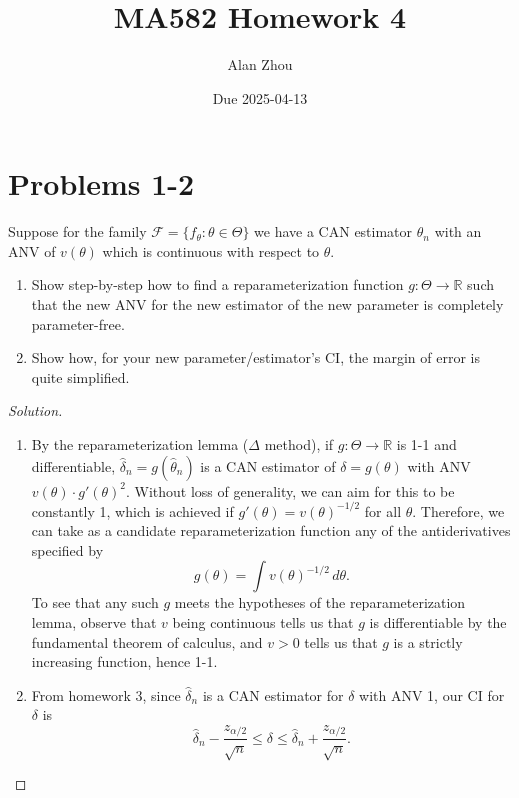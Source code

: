 \documentclass{article}
\title{MA582 Homework 4}
\author{Alan Zhou}
\date{Due 2025-04-13}
\begin{document}
\maketitle


\section{Problems 1-2}

Suppose for the family $\mathcal{F} = \{f_{\theta}:\theta\in\Theta\}$ we have a CAN estimator $\hat{\theta}_n$ with an ANV of $v(\theta)$ which is continuous with respect to $\theta$.

\begin{enumerate}
\item Show step-by-step how to find a reparameterization function $g:\Theta\to\mathbb{R}$ such that the new ANV for the new estimator of the new parameter is completely parameter-free.
\item Show how, for your new parameter/estimator's CI, the margin of error is quite simplified.
\end{enumerate}

\begin{proof}[Solution]
\begin{enumerate}
\item By the reparameterization lemma ($\Delta$ method), if $g:\Theta\to\mathbb{R}$ is 1-1 and differentiable, $\hat{\delta}_n = g(\hat{\theta}_n)$ is a CAN estimator of $\delta = g(\theta)$ with ANV $v(\theta)\cdot g'(\theta)^2$. Without loss of generality, we can aim for this to be constantly 1, which is achieved if $g'(\theta) = v(\theta)^{-1/2}$ for all $\theta$. Therefore, we can take as a candidate reparameterization function any of the antiderivatives specified by
\begin{equation*}
g(\theta) = \int v(\theta)^{-1/2}\,d\theta.
\end{equation*}
To see that any such $g$ meets the hypotheses of the reparameterization lemma, observe that $v$ being continuous tells us that $g$ is differentiable by the fundamental theorem of calculus, and $v > 0$ tells us that $g$ is a strictly increasing function, hence 1-1.
\item From homework 3, since $\hat{\delta}_n$ is a CAN estimator for $\delta$ with ANV 1, our CI for $\delta$ is
\begin{equation*}
\hat{\delta}_n - \frac{z_{\alpha/2}}{\sqrt{n}}\leq\delta\leq\hat{\delta}_n + \frac{z_{\alpha/2}}{\sqrt{n}}.
\end{equation*}
\end{enumerate}
\end{proof}
\end{document}
